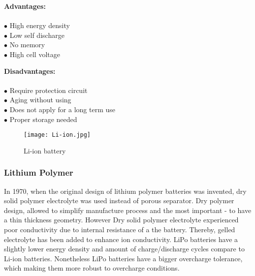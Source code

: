 \begin{multicols}{2}
	
	\textbf{Advantages:} \\ \\
	$\bullet$ High energy density\\
	$\bullet$ Low self discharge\\
	$\bullet$ No memory\\
	$\bullet$ High cell voltage\\
	
	
	
	
	\columnbreak
	
	\textbf{Disadvantages:} \\ \\
	$\bullet$ Require protection circuit\\
	$\bullet$ Aging without using\\
	$\bullet$ Does not apply for a long term use\\
	$\bullet$ Proper storage needed 

	
	
\end{multicols}


\begin{figure}[h]
	\centering
	\texttt{[image: Li-ion.jpg]}
	\caption{ Li-ion battery \cite{11}}
	\label{fig: EPS}
\end{figure}

\subsubsection{Lithium Polymer \label{sec:tech}}

In 1970, when the original design of lithium polymer batteries was invented, dry solid polymer electrolyte was used instead of  porous separator. Dry polymer design, allowed to simplify manufacture process and the most important - to have a thin thickness geometry. However Dry solid polymer electrolyte experienced poor conductivity due to internal resistance of a the battery. Thereby, gelled electrolyte has been added to enhance ion conductivity. LiPo batteries have a slightly lower energy density and amount of charge/discharge cycles compare to Li-ion batteries. Nonetheless LiPo batteries have a bigger overcharge tolerance, which making them more robust to overcharge conditions.


